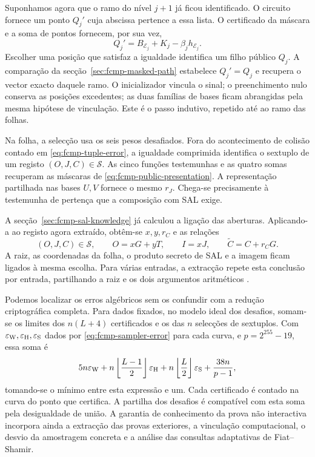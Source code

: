 Suponhamos agora que o ramo do nível \(j+1\) já ficou
identificado. O circuito fornece um ponto \(Q_j'\)
cuja abscissa pertence a essa lista. O certificado da
máscara e a soma de pontos fornecem, por sua vez,
\[
 Q_j'=B_{\mathcal E_j}+K_j-\beta_jh_{\mathcal E_j}.
\]
Escolher uma posição que satisfaz a igualdade identifica
um filho público \(Q_j\). A comparação da
secção~\ref{sec:fcmp-masked-path} estabelece
\(Q_j'=Q_j\) e recupera o vector exacto daquele ramo.
O inicializador vincula o sinal; o preenchimento nulo
conserva as posições excedentes; as duas famílias de bases
ficam abrangidas pela mesma hipótese de vinculação.
Este é o passo indutivo, repetido até ao ramo das folhas.

Na folha, a selecção usa os seis pesos desafiados.
Fora do acontecimento de colisão contado em
\eqref{eq:fcmp-tuple-error}, a igualdade comprimida
identifica o sextuplo de um registo \((O,J,C)\in\mathcal S\).
As cinco funções testemunhas e as quatro somas recuperam
as máscaras de \eqref{eq:fcmp-public-presentation}.
A representação partilhada nas bases \(U,V\) fornece
o mesmo \(r_J\). Chega-se precisamente à testemunha
de pertença que a composição com SAL exige.

A secção~\ref{sec:fcmp-sal-knowledge} já calculou a ligação
das aberturas. Aplicando-a ao registo agora extraído,
obtêm-se \(x,y,r_C\) e as relações
\[
 (O,J,C)\in\mathcal S,\qquad
 O=xG+yT,\qquad I=xJ,\qquad
 \widetilde C=C+r_CG.
\]
A raiz, as coordenadas da folha, o produto secreto de SAL
e a imagem ficam ligados à mesma escolha. Para várias
entradas, a extracção repete esta conclusão por entrada,
partilhando a raiz e os dois argumentos aritméticos
\cite{fcmp-composition-review}.

Podemos localizar os erros algébricos sem os confundir
com a redução criptográfica completa. Para dados fixados,
no modelo ideal dos desafios, somam-se os limites dos
\(n(L+4)\) certificados e os das \(n\) selecções de
sextuplos. Com \(\varepsilon_{\rm W},\varepsilon_{\rm H},
\varepsilon_{\rm S}\) dados por \eqref{eq:fcmp-sampler-error}
para cada curva, e \(p=2^{255}-19\), essa soma é
\[
 5n\varepsilon_{\rm W}
 +n\left\lfloor\frac{L-1}{2}\right\rfloor\varepsilon_{\rm H}
 +n\left\lfloor\frac L2\right\rfloor\varepsilon_{\rm S}
 +\frac{38n}{p-1},
\]
tomando-se o mínimo entre esta expressão e um. Cada certificado é contado
na curva do ponto que certifica. A partilha dos desafios
é compatível com esta soma pela desigualdade de união.
A garantia de conhecimento da prova não interactiva
incorpora ainda a extracção das provas exteriores, a
vinculação computacional, o desvio da amostragem concreta
e a análise das consultas adaptativas de Fiat--Shamir.

